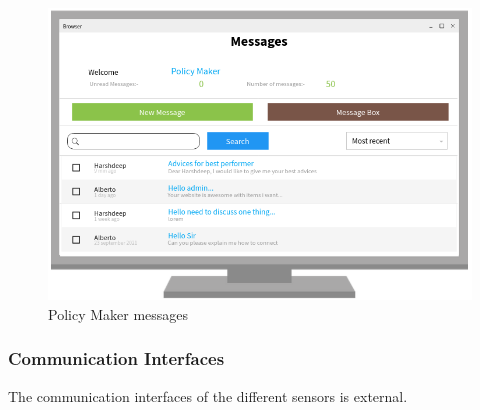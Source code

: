 \begin{figure}[H]
	\centering
	\includegraphics[width=0.8\columnwidth]{Images/messages_policy_maker.png}
	\caption{Policy Maker messages}
	\label{Fig:interface_messages_policy_maker}
\end{figure}
%


\subsubsection{Communication Interfaces}
The communication interfaces of the different sensors is external.
